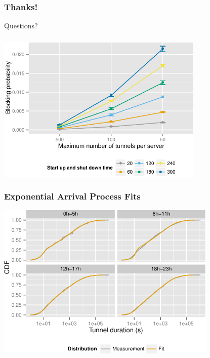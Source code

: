 \documentclass{beamer}
\begin{document}
\section*{}
\begin{frame}
	\frametitle{Thanks!}

	\centering
		\Large Questions?
\end{frame}

\appendix
{}
\setcounter{finalframe}{\value{framenumber}}

\begin{frame}
\end{frame}




\begin{frame}
	\frametitle{}
	\begin{center}
		\includegraphics[height=7cm]{figures/compare-maxinstances-block.pdf}
	\end{center}
\end{frame}


\begin{frame}
	\frametitle{Exponential Arrival Process Fits}

	\begin{center}
		\includegraphics[height=7.5cm]{figures/timeslot-fits.pdf}
	\end{center}
\end{frame}
\end{document}
